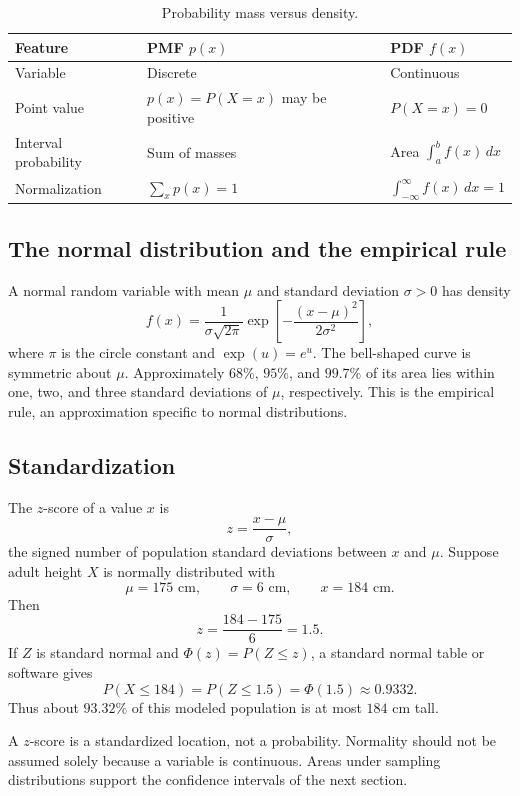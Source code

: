 \documentclass[11pt]{article}
\begin{document}
\begin{table}[ht]
\centering
\caption{Probability mass versus density.}
\begin{tabularx}{\textwidth}{@{}lYY@{}}
\toprule
Feature & PMF $p(x)$ & PDF $f(x)$ \\
\midrule
Variable & Discrete & Continuous \\
Point value & $p(x)=P(X=x)$ may be positive & $P(X=x)=0$ \\
Interval probability & Sum of masses & Area $\int_a^b f(x)\,dx$ \\
Normalization & $\sum_xp(x)=1$ & $\int_{-\infty}^{\infty}f(x)\,dx=1$ \\
\bottomrule
\end{tabularx}
\end{table}

\subsection{The normal distribution and the empirical rule}
A normal random variable with mean $\mu$ and standard deviation $\sigma>0$
has density
\begin{equation}
f(x)=\frac{1}{\sigma\sqrt{2\pi}}
\exp\!\left[-\frac{(x-\mu)^2}{2\sigma^2}\right],
\end{equation}
where $\pi$ is the circle constant and $\exp(u)=e^u$.  The bell-shaped curve
is symmetric about $\mu$.  Approximately $68\%$, $95\%$, and $99.7\%$ of its
area lies within one, two, and three standard deviations of $\mu$,
respectively.  This is the empirical rule, an approximation specific to
normal distributions.

\subsection{Standardization}
The $z$-score of a value $x$ is
\begin{equation}\label{eq:zscore}
z=\frac{x-\mu}{\sigma},
\end{equation}
the signed number of population standard deviations between $x$ and $\mu$.
Suppose adult height $X$ is normally distributed with
\[
\mu=175\text{ cm},\qquad \sigma=6\text{ cm},\qquad x=184\text{ cm}.
\]
Then
\[
z=\frac{184-175}{6}=1.5.
\]
If $Z$ is standard normal and $\Phi(z)=P(Z\le z)$, a standard normal table or
software gives
\[
P(X\le184)=P(Z\le1.5)=\Phi(1.5)\approx0.9332.
\]
Thus about $93.32\%$ of this modeled population is at most $184$ cm tall.

\begin{keybox}
A $z$-score is a standardized location, not a probability.  Normality should
not be assumed solely because a variable is continuous.  Areas under sampling
distributions support the confidence intervals of the next section.
\end{keybox}
\end{document}
